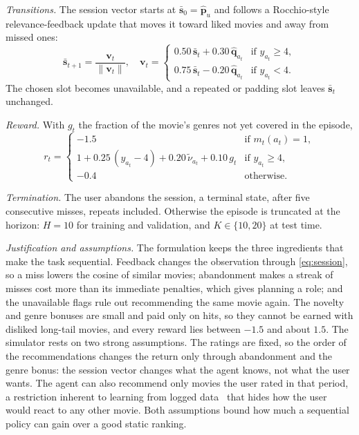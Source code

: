 \emph{Transitions.} The session vector starts at $\bar{\mathbf{s}}_0 = \hat{\mathbf{p}}_u$ and follows a Rocchio-style relevance-feedback update that moves it toward liked movies and away from missed ones:
\begin{equation}
\bar{\mathbf{s}}_{t+1} = \frac{\mathbf{v}_t}{\lVert \mathbf{v}_t \rVert},\quad
\mathbf{v}_t =
\begin{cases}
0.50\,\bar{\mathbf{s}}_t + 0.30\,\hat{\mathbf{q}}_{a_t} & \text{if } y_{a_t} \ge 4,\\
0.75\,\bar{\mathbf{s}}_t - 0.20\,\hat{\mathbf{q}}_{a_t} & \text{if } y_{a_t} < 4.
\end{cases}
\label{eq:session}
\end{equation}
The chosen slot becomes unavailable, and a repeated or padding slot leaves $\bar{\mathbf{s}}_t$ unchanged.

\emph{Reward.} With $g_t$ the fraction of the movie's genres not yet covered in the episode,
\begin{equation}
r_t =
\begin{cases}
-1.5 & \text{if } m_t(a_t) = 1,\\
1 + 0.25\,(y_{a_t} - 4) + 0.20\,\tilde{\nu}_{a_t} + 0.10\,g_t & \text{if } y_{a_t} \ge 4,\\
-0.4 & \text{otherwise}.
\end{cases}
\label{eq:reward}
\end{equation}

\emph{Termination.} The user abandons the session, a terminal state, after five consecutive misses, repeats included. Otherwise the episode is truncated at the horizon: $H = 10$ for training and validation, and $K \in \{10, 20\}$ at test time.

\emph{Justification and assumptions.} The formulation keeps the three ingredients that make the task sequential. Feedback changes the observation through \eqref{eq:session}, so a miss lowers the cosine of similar movies; abandonment makes a streak of misses cost more than its immediate penalties, which gives planning a role; and the unavailable flags rule out recommending the same movie again. The novelty and genre bonuses are small and paid only on hits, so they cannot be earned with disliked long-tail movies, and every reward lies between $-1.5$ and about $1.5$. The simulator rests on two strong assumptions. The ratings are fixed, so the order of the recommendations changes the return only through abandonment and the genre bonus: the session vector changes what the agent knows, not what the user wants. The agent can also recommend only movies the user rated in that period, a restriction inherent to learning from logged data~\cite{levine2020offline} that hides how the user would react to any other movie. Both assumptions bound how much a sequential policy can gain over a good static ranking.

